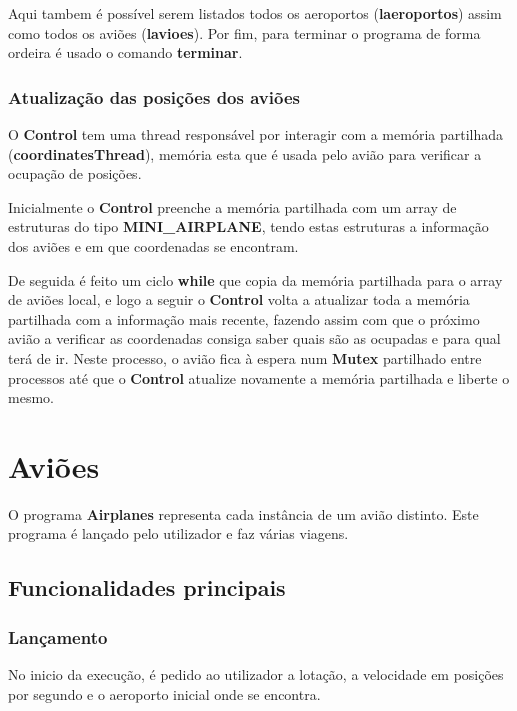 \documentclass[11pt]{article}
\begin{document}
	Aqui tambem é possível serem listados todos os aeroportos (\textbf{laeroportos}) assim como todos os aviões (\textbf{lavioes}).
	Por fim, para terminar o programa de forma ordeira é usado o comando \textbf{terminar}.
	
	
	\large
	\subsubsection{Atualização das posições dos aviões}
	\normalsize
	
	O \textbf{Control} tem uma thread responsável por interagir com a memória partilhada (\textbf{coordinatesThread}), memória esta que é usada pelo avião para verificar a ocupação de posições.
	
	Inicialmente o \textbf{Control} preenche a memória partilhada com um array de estruturas do tipo \textbf{MINI\_AIRPLANE}, tendo estas estruturas a informação dos aviões e em que coordenadas se encontram.
	
	De seguida é feito um ciclo \textbf{while} que copia da memória partilhada para o array de aviões local, e logo a seguir o \textbf{Control} volta a atualizar toda a memória partilhada com a informação mais recente, fazendo assim com que o próximo avião a verificar as coordenadas consiga saber quais são as ocupadas e para qual terá de ir. Neste processo, o avião fica à espera num \textbf{Mutex} partilhado entre processos até que o \textbf{Control} atualize novamente a memória partilhada e liberte o mesmo.
	
	
	\large
	\section{Aviões}
	\normalsize
	
	O programa \textbf{Airplanes} representa cada instância de um avião distinto. Este programa é lançado pelo utilizador e faz várias viagens. 
	
	
	\large
	\subsection{Funcionalidades principais}
	\subsubsection{Lançamento}
	\normalsize
	
	No inicio da execução, é pedido ao utilizador a lotação, a velocidade em posições por segundo e o aeroporto inicial onde se encontra.
	
\end{document}
